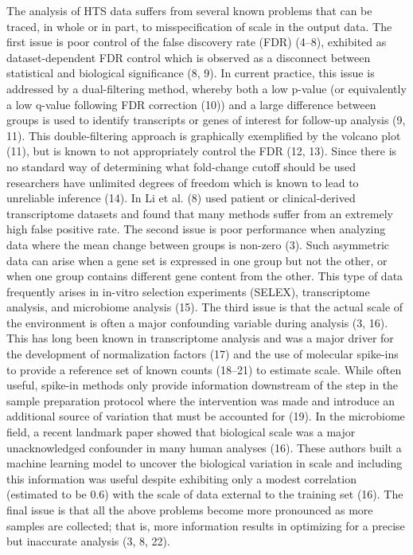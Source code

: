\documentclass[
]{article}
\providecommand{\DIFadd}[1]{{\protect\color{blue}\uwave{#1}}} %
\providecommand{\DIFaddbegin}{} %
\providecommand{\DIFaddend}{} %
\newcommand{\DIFaddincludegraphics}[2][]{{\color{blue}\fbox{\DIFOincludegraphics[#1]{#2}}}} %
\DeclareRobustCommand{\DIFaddbegin}{\DIFOaddbegin \let\includegraphics\DIFaddincludegraphics} %
\DeclareRobustCommand{\DIFaddend}{\DIFOaddend \let\includegraphics\DIFOincludegraphics} %
\begin{document}
The analysis of HTS data suffers from several known problems that can be
traced, in whole or in part, to misspecification of scale in the output
data. The first issue is poor control of the false discovery rate (FDR)
(4--8), exhibited as dataset-dependent FDR control which is observed as
a disconnect between statistical and biological significance (8, 9). In
current practice, this issue is addressed by a dual-filtering method,
whereby both a low p-value (or equivalently a low q-value following FDR
correction (10)) and a large difference between groups is used to
identify transcripts or genes of interest for follow-up analysis (9,
11). This double-filtering approach is graphically exemplified by the
volcano plot (11), but is known to not appropriately control the FDR
(12, 13). Since there is no standard way of determining what fold-change
cutoff should be used researchers have unlimited degrees of freedom
which is known to lead to unreliable inference (14). In  \DIFaddbegin \DIFadd{a recent
example, }\DIFaddend Li et al. (8) used patient or clinical-derived transcriptome
datasets and found that many methods suffer from an extremely high false
positive rate. The second issue is poor performance when analyzing data
where the mean change between groups is non-zero (3). Such asymmetric
data can arise when a gene set is expressed in one group but not the
other, or when one group contains different gene content from the other.
This type of data frequently arises in in-vitro selection experiments
(SELEX), transcriptome analysis, and microbiome analysis (15). The third
issue is that the actual scale of the environment is often a major
confounding variable during analysis (3, 16). This has long been known
in transcriptome analysis and was a major driver for the development of
normalization factors (17) and the use of molecular spike-ins to provide
a reference set of known counts (18--21) to estimate scale. While often
useful, spike-in methods only provide information downstream of the step
in the sample preparation protocol where the intervention was made and
introduce an additional source of variation that must be accounted for
(19). In the microbiome field, a recent landmark paper showed that
biological scale was a major unacknowledged confounder in many human
analyses (16). These authors built a machine learning model to uncover
the biological variation in scale and including this information was
useful despite exhibiting only a modest correlation (estimated to be
0.6) with the scale of data external to the training set (16). The final
issue is that all the above problems become more pronounced as more
samples are collected; that is, more information results in optimizing
for a precise but inaccurate analysis (3, 8, 22).
\end{document}

